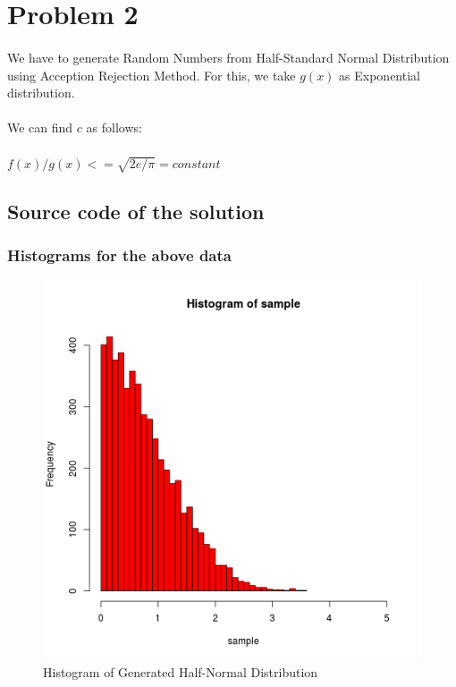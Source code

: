 \documentclass{article}
\begin{document}
	    \pagebreak
	    \section{Problem 2}
	    \paragraph{}
		We have to generate Random Numbers from Half-Standard Normal Distribution using Acception Rejection Method. For this, we take $g(x)$ as Exponential distribution.
		
		\paragraph{}
		We can find $c$ as follows:
		\paragraph{}
		$f(x)/g(x)<=\sqrt{2e/\pi}=constant$
			
		
	\subsection{Source code of the solution}			                       
		
		\pagebreak
		\subsubsection{Histograms for the above data}
			\begin{figure}[!ht]
  			\includegraphics[width=\linewidth]{pic/que2_in_R.png}
 			 \caption{Histogram of Generated Half-Normal Distribution}
  			\label{fig:hist1_1}
		\end{figure}
		
\end{document}
